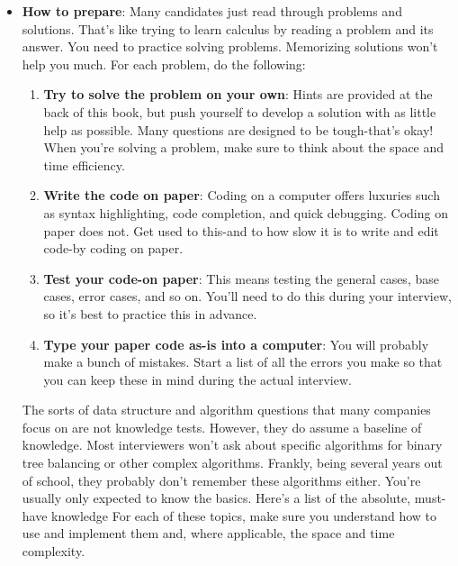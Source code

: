 \documentclass{report}
\begin{document}
    \pagebreak 
    \begin{itemize}
        \item \textbf{How to prepare}: Many candidates just read through problems and solutions. That's like trying to learn calculus by reading a problem and its answer. You need to practice solving problems. Memorizing solutions won't help you much. 
            \bigbreak \noindent 
            For each problem, do the following:
            \begin{enumerate}
                \item \textbf{Try to solve the problem on your own}: Hints are provided at the back of this book, but push yourself to develop a solution with as little help as possible. Many questions are designed to be tough-that's okay! When you're solving a problem, make sure to think about the space and time efficiency.
                \item \textbf{Write the code on paper}: Coding on a computer offers luxuries such as syntax highlighting, code completion, and quick debugging. Coding on paper does not. Get used to this-and to how slow it is to write and edit code-by coding on paper.
                \item \textbf{Test your code-on paper}: This means testing the general cases, base cases, error cases, and so on. You'll need to do this during your interview, so it's best to practice this in advance.
                \item \textbf{Type your paper code as-is into a computer}: You will probably make a bunch of mistakes. Start a list of all the errors you make so that you can keep these in mind during the actual interview.
            \end{enumerate}
            The sorts of data structure and algorithm questions that many companies focus on are not knowledge tests. However, they do assume a baseline of knowledge.
            \bigbreak \noindent 
            Most interviewers won't ask about specific algorithms for binary tree balancing or other complex algorithms. Frankly, being several years out of school, they probably don't remember these algorithms either.
            \bigbreak \noindent 
            You're usually only expected to know the basics. Here's a list of the absolute, must-have knowledge
            \bigbreak \noindent 
            \bigbreak \noindent 
            For each of these topics, make sure you understand how to use and implement them and, where applicable, the space and time complexity.

\end{itemize}
\end{document}
